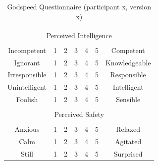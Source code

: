 \begin{table}[H]
\begin{center}
\begin{tabular}{|c|c|c|c|c|c|c|}
            \hline
            \multicolumn{7}{|c|}{ } \\[-1em]
    		\multicolumn{7}{|c|}{Perceived Intelligence} \\[-1em]
            \multicolumn{7}{|c|}{ } \\
    		Incompetent		& 1 & 2 & 3 & 4 & 5 & 	Competent \\
    		Ignorant		& 1 & 2 & 3 & 4 & 5 & 	Knowledgeable \\
    		Irresponsible	& 1 & 2 & 3 & 4 & 5 & 	Responsible \\
    		Unintelligent	& 1 & 2 & 3 & 4 & 5 & 	Intelligent \\
    		Foolish			& 1 & 2 & 3 & 4 & 5 & 	Sensible \\
            \hline
            \multicolumn{7}{|c|}{ } \\[-1em]
    		\multicolumn{7}{|c|}{Perceived Safety} \\[-1em]
            \multicolumn{7}{|c|}{ } \\
    		Anxious			& 1 & 2 & 3 & 4 & 5 & 	Relaxed \\
    		Calm			& 1 & 2 & 3 & 4 & 5 & 	Agitated \\
    		Still			& 1 & 2 & 3 & 4 & 5 & 	Surprised \\
    		\hline
    	\end{tabular}
    \end{center}
    \caption{Godspeed Questionnaire (participant x, version x)}
\end{table}

\enlargethispage{1em}